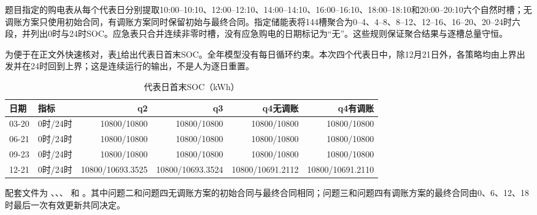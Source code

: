 题目指定的购电表从每个代表日分别提取10:00--10:10、12:00--12:10、14:00--14:10、16:00--16:10、18:00--18:10和20:00--20:10六个自然时槽；无调账方案只使用初始合同，有调账方案同时保留初始与最终合同。指定储能表将144槽聚合为0--4、4--8、8--12、12--16、16--20、20--24时六段，并列出0时与24时SOC。应急表只合并连续非零时槽，没有应急购电的日期标记为“无”。这些规则保证聚合结果与逐槽总量守恒。

为便于在正文外快速核对，表\ref{tab:rep-soc}给出代表日首末SOC。全年模型没有每日循环约束。本次四个代表日中，除12月21日外，各策略均由上界出发并在24时回到上界；这是连续运行的输出，不是人为逐日重置。

\begin{table}[H]
\centering
\caption{代表日首末SOC（kWh）}
\label{tab:rep-soc}
\scriptsize
\setlength{\tabcolsep}{3pt}
\begin{tabular}{llrrrr}
\toprule
日期 & 指标 & q2 & q3 & q4无调账 & q4有调账\\
\midrule
03-20 & 0时/24时 & 10800/10800 & 10800/10800 & 10800/10800 & 10800/10800\\
06-21 & 0时/24时 & 10800/10800 & 10800/10800 & 10800/10800 & 10800/10800\\
09-23 & 0时/24时 & 10800/10800 & 10800/10800 & 10800/10800 & 10800/10800\\
12-21 & 0时/24时 & 10800/10693.3525 & 10800/10693.3524 & 10800/10691.2112 & 10800/10691.2110\\
\bottomrule
\end{tabular}
\end{table}

配套文件为 、、、
 和 。其中问题二和问题四无调账方案的初始合同与最终合同相同；问题三和问题四有调账方案的最终合同由0、6、12、18时最后一次有效更新共同决定。
